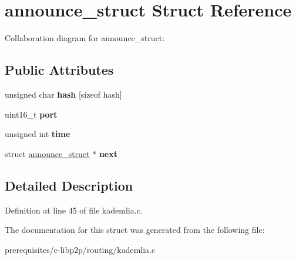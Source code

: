 \hypertarget{structannounce__struct}{}\section{announce\+\_\+struct Struct Reference}
\label{structannounce__struct}


Collaboration diagram for announce\+\_\+struct\+:
\subsection*{Public Attributes}
\begin{DoxyCompactItemize}
\item 
\mbox{\label{structannounce__struct_af432e65c2a70271e21a22d5585285430}} 
unsigned char {\bfseries hash} \mbox{[}sizeof hash\mbox{]}
\item 
\mbox{\label{structannounce__struct_a22128be6d55184c5871cc0d4521b15f7}} 
uint16\+\_\+t {\bfseries port}
\item 
\mbox{\label{structannounce__struct_a754abda98438a2c921b5075d15e2b011}} 
unsigned int {\bfseries time}
\item 
\mbox{\label{structannounce__struct_af07de193e50cd2d92adbf984268845c1}} 
struct \mbox{\hyperlink{structannounce__struct}{announce\+\_\+struct}} $\ast$ {\bfseries next}
\end{DoxyCompactItemize}


\subsection{Detailed Description}


Definition at line 45 of file kademlia.\+c.



The documentation for this struct was generated from the following file\+:\begin{DoxyCompactItemize}
\item 
prerequisites/c-\/libp2p/routing/kademlia.\+c\end{DoxyCompactItemize}
